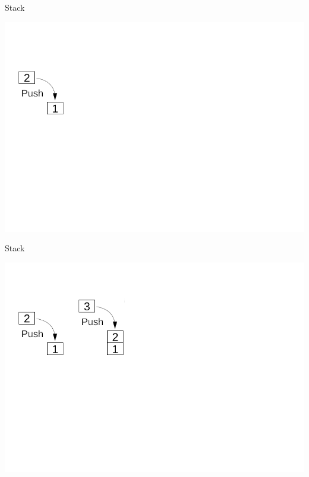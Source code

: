 \documentclass[aspectratio=169]{beamer}
\begin{document}
\begin{frame}{Stack}
    \begin{center}
        \includegraphics[scale=0.4625]{images/stack/Stack_1.png}
    \end{center}
\end{frame}

\begin{frame}{Stack}
    \begin{center}
        \includegraphics[scale=0.4625]{images/stack/Stack_2.png}
    \end{center}
\end{frame}
\end{document}
